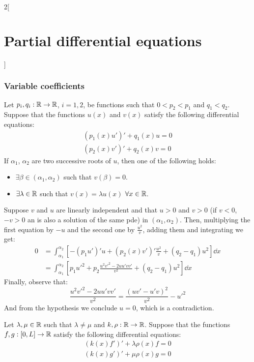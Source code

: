 \documentclass[../../../main_math.tex]{subfiles}
\begin{document}
\begin{multicols}{2}[\section{Partial differential equations}]
  \subsubsection{Variable coefficients}
  \begin{theorem}
    Let $p_i,q_i:\mathbb{R}\rightarrow\mathbb{R}$, $i=1,2$, be functions such that $0<p_2<p_1$ and $q_1<q_2$. Suppose that the functions $u(x)$ and $v(x)$ satisfy the following differential equations:
    \begin{align*}
      {(p_1(x)u')}'+q_1(x)u=0 \\
      {(p_2(x)v')}'+q_2(x)v=0
    \end{align*}
    If $\alpha_1$, $\alpha_2$ are two successive roots of $u$, then one of the following holds:
    \begin{itemize}
      \item $\exists \beta\in(\alpha_1,\alpha_2)$ such that $v(\beta)=0$.
      \item $\exists\lambda\in\mathbb{R}$ such that $v(x)=\lambda u(x)$ $\forall x\in\mathbb{R}$.
    \end{itemize}
  \end{theorem}
  \begin{sproof}
    Suppose $v$ and $u$ are linearly independent and that $u>0$ and $v>0$ (if $v<0$, $-v>0$ an is also a solution of the same pde) in $(\alpha_1,\alpha_2)$. Then, multiplying the first equation by $-u$ and the second one by $\frac{u^2}{v}$, adding them and integrating we get:
    \begin{align*}
      0 & =\int_{\alpha_1}^{\alpha_2}\left[-{(p_1u')}'u +{(p_2(x)v')}'\frac{u^2}{v} +(q_2 -q_1)u^2\right]\dd{x}  \\
        & =\int_{\alpha_1}^{\alpha_2}\left[p_1{u'}^2+p_2\frac{u^2{v'}^2-2uu'vv'}{v^2}+(q_2 -q_1)u^2\right]\dd{x}
    \end{align*}
    Finally, observe that: $$\frac{u^2{v'}^2- 2uu'vv'}{v^2}=\frac{{(uv'-u'v)}^2}{v^2}-{u'}^2$$ And from the hypothesis we conclude $u=0$, which is a contradiction.
  \end{sproof}
  \begin{proposition}\label{PDE:orthogonality}
    Let $\lambda,\mu\in\mathbb{R}$ such that $\lambda\ne \mu$ and $k,\rho:\mathbb{R}\rightarrow\mathbb{R}$. Suppose that the functions $f,g:[0,L]\rightarrow\mathbb{R}$ satisfy the following differential equations:
    \begin{align*}
      {(k(x)f')}'+\lambda \rho(x)f=0 \\
      {(k(x)g')}'+\mu \rho(x)g=0
    \end{align*}

\end{proposition}
\end{multicols}
\end{document}

